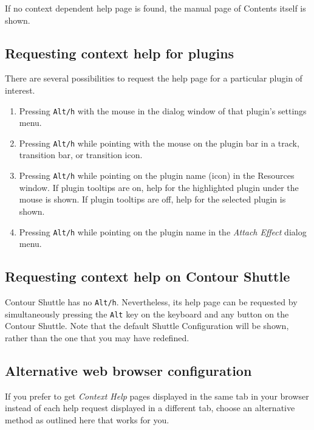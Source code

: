 If no context dependent help page is found, the manual page of Contents itself is shown.

\subsection{Requesting context help for plugins}%
\label{sub:context_help_plugins}

There are several possibilities to request the help page for a particular plugin of interest.

\begin{enumerate}
	\item Pressing \texttt{Alt/h} with the mouse in the dialog window of that plugin's settings menu.
	\item Pressing \texttt{Alt/h} while pointing with the mouse on the plugin bar in a track, transition bar, or transition icon.
	\item Pressing \texttt{Alt/h} while pointing on the plugin name (icon) in the Resources window. If plugin tooltips are on, help for the highlighted plugin under the mouse is shown. If plugin tooltips are off, help for the selected plugin is shown.
	\item Pressing \texttt{Alt/h} while pointing on the plugin name in the \textit{Attach Effect} dialog menu.
\end{enumerate}

\subsection{Requesting context help on Contour Shuttle}%
\label{sub:context_help_contour_shuttle}

Contour Shuttle has no \texttt{Alt/h}. Nevertheless, its help page can be requested by simultaneously pressing the \texttt{Alt} key on the keyboard and any button on the Contour Shuttle.  Note that the default Shuttle Configuration will be shown, rather than the one that you may have redefined.

\subsection{Alternative web browser configuration}%
\label{sub:alt_browser}

If you prefer to get \textit{Context Help} pages displayed in the same tab
in your browser instead of each help request displayed in a different tab,
choose an alternative method as outlined here that works for you.

